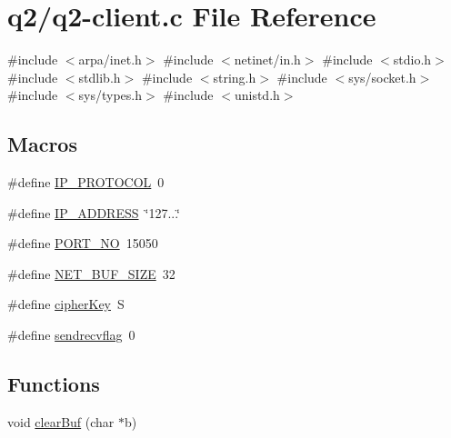 \hypertarget{q2-client_8c}{}\section{q2/q2-\/client.c File Reference}
\label{q2-client_8c}
{\ttfamily \#include $<$arpa/inet.\+h$>$}\newline
{\ttfamily \#include $<$netinet/in.\+h$>$}\newline
{\ttfamily \#include $<$stdio.\+h$>$}\newline
{\ttfamily \#include $<$stdlib.\+h$>$}\newline
{\ttfamily \#include $<$string.\+h$>$}\newline
{\ttfamily \#include $<$sys/socket.\+h$>$}\newline
{\ttfamily \#include $<$sys/types.\+h$>$}\newline
{\ttfamily \#include $<$unistd.\+h$>$}\newline
\subsection*{Macros}
\begin{DoxyCompactItemize}
\item 
\#define \hyperlink{q2-client_8c_ac0a4ce3bd388c7823743b526e7cb77fb}{I\+P\+\_\+\+P\+R\+O\+T\+O\+C\+OL}~0
\item 
\#define \hyperlink{q2-client_8c_ad8a262037cbfb38d1512f0073eeb7a66}{I\+P\+\_\+\+A\+D\+D\+R\+E\+SS}~\char`\"{}127...\char`\"{}
\item 
\#define \hyperlink{q2-client_8c_a47a4d3bbd05894abbce0ffd1d266aa88}{P\+O\+R\+T\+\_\+\+NO}~15050
\item 
\#define \hyperlink{q2-client_8c_a30ba2113ad1b0f91029d017fc988d9af}{N\+E\+T\+\_\+\+B\+U\+F\+\_\+\+S\+I\+ZE}~32
\item 
\#define \hyperlink{q2-client_8c_abace6f1e028b11cc237bd95c5dbe451a}{cipher\+Key}~\textquotesingle{}S\textquotesingle{}
\item 
\#define \hyperlink{q2-client_8c_a6e618c0ec6ffc8ac4489d11c65a5a67c}{sendrecvflag}~0
\end{DoxyCompactItemize}
\subsection*{Functions}
\begin{DoxyCompactItemize}
\item 
void \hyperlink{q2-client_8c_a37e9b2e0b0fcbe7d2d5bd9c9467c1fb8}{clear\+Buf} (char $\ast$b)
\end{DoxyCompactItemize}


